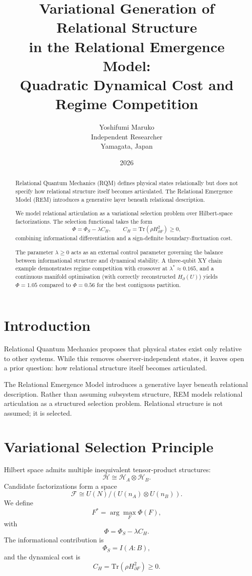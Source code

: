 \documentclass[11pt]{article}
\title{Variational Generation of Relational Structure\\in the Relational Emergence Model:\\{\normalsize Quadratic Dynamical Cost and Regime Competition}}
\author{Yoshifumi Maruko\\Independent Researcher\\Yamagata, Japan}
\date{2026}
\begin{document}
\maketitle

\begin{abstract}
Relational Quantum Mechanics (RQM) defines physical states relationally but does not specify how relational structure itself becomes articulated. The Relational Emergence Model (REM) introduces a generative layer beneath relational description.

We model relational articulation as a variational selection problem over Hilbert-space factorizations. The selection functional takes the form
\[
\Phi = \Phi_S - \lambda C_H,
\qquad
C_H = \mathrm{Tr}(\rho H_{\partial F}^2) \geq 0,
\]
combining informational differentiation and a sign-definite boundary-fluctuation cost.

The parameter $\lambda\geq0$ acts as an external control parameter governing the balance between informational structure and dynamical stability. A three-qubit XY chain example demonstrates regime competition with crossover at $\lambda^*\approx0.165$, and a continuous manifold optimisation (with correctly reconstructed $H_{\partial}(U)$) yields $\Phi=1.05$ compared to $\Phi=0.56$ for the best contiguous partition.
\end{abstract}

\section{Introduction}
Relational Quantum Mechanics proposes that physical states exist only relative to other systems. While this removes observer-independent states, it leaves open a prior question: how relational structure itself becomes articulated.

The Relational Emergence Model introduces a generative layer beneath relational description. Rather than assuming subsystem structure, REM models relational articulation as a structured selection problem. Relational structure is not assumed; it is selected.

\section{Variational Selection Principle}
Hilbert space admits multiple inequivalent tensor-product structures:
\[
\mathcal H \cong \mathcal H_A \otimes \mathcal H_B.
\]
Candidate factorizations form a space
\[
\mathcal F\cong U(N)/(U(n_A)\otimes U(n_B)).
\]
We define
\[
F^*=\arg\max_F\Phi(F),
\]
with
\[
\Phi=\Phi_S-\lambda C_H.
\]
The informational contribution is
\[
\Phi_S=I(A:B),
\]
and the dynamical cost is
\[
C_H=\mathrm{Tr}(\rho H_{\partial F}^2)\geq0.
\]
\end{document}
